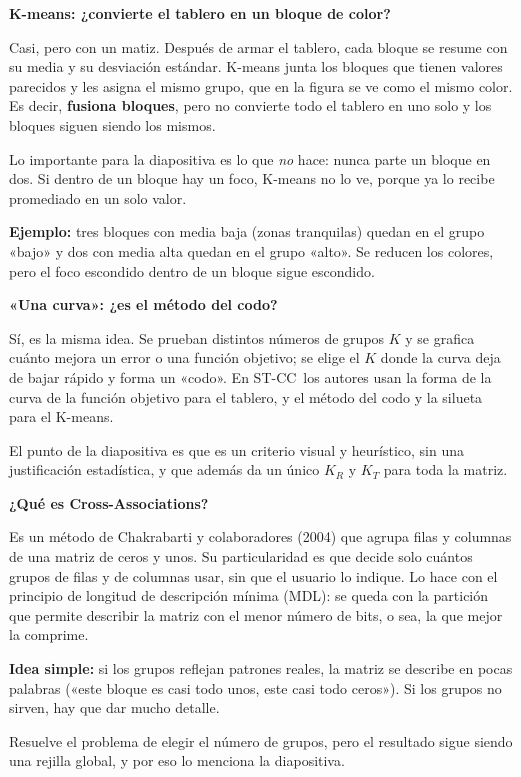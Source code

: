 \documentclass[11pt,a4paper]{article}
\newcommand{\cajainicio}[3]{\par\medskip\noindent
  \begin{lrbox}{\cajabox}\begin{minipage}{\dimexpr\linewidth-2\fboxsep-2\fboxrule\relax}%
  \textbf{\color{#1}#3}\par\smallskip}
\newcommand{\cajafin}[2]{\end{minipage}\end{lrbox}\fcolorbox{#1}{#2}{\usebox{\cajabox}}\par\medskip}
\newenvironment{nota}[1]{\cajainicio{acc}{acc!7}{#1}}{\cajafin{acc}{acc!7}}
\newcommand{\STCC}{ST-CC}
\begin{document}
\begin{nota}{K-means: ¿convierte el tablero en un bloque de color?}
Casi, pero con un matiz. Después de armar el tablero, cada bloque se resume con su media y su desviación estándar. K-means junta los bloques que tienen valores parecidos y les asigna el mismo grupo, que en la figura se ve como el mismo color. Es decir, \textbf{fusiona bloques}, pero no convierte todo el tablero en uno solo y los bloques siguen siendo los mismos.

Lo importante para la diapositiva es lo que \emph{no} hace: nunca parte un bloque en dos. Si dentro de un bloque hay un foco, K-means no lo ve, porque ya lo recibe promediado en un solo valor.

\textbf{Ejemplo:} tres bloques con media baja (zonas tranquilas) quedan en el grupo «bajo» y dos con media alta quedan en el grupo «alto». Se reducen los colores, pero el foco escondido dentro de un bloque sigue escondido.
\end{nota}

\begin{nota}{«Una curva»: ¿es el método del codo?}
Sí, es la misma idea. Se prueban distintos números de grupos $K$ y se grafica cuánto mejora un error o una función objetivo; se elige el $K$ donde la curva deja de bajar rápido y forma un «codo». En \STCC\ los autores usan la forma de la curva de la función objetivo para el tablero, y el método del codo y la silueta para el K-means.

El punto de la diapositiva es que es un criterio visual y heurístico, sin una justificación estadística, y que además da un único $K_R$ y $K_T$ para toda la matriz.
\end{nota}

\begin{nota}{¿Qué es Cross-Associations?}
Es un método de Chakrabarti y colaboradores (2004) que agrupa filas y columnas de una matriz de ceros y unos. Su particularidad es que decide solo cuántos grupos de filas y de columnas usar, sin que el usuario lo indique. Lo hace con el principio de longitud de descripción mínima (MDL): se queda con la partición que permite describir la matriz con el menor número de bits, o sea, la que mejor la comprime.

\textbf{Idea simple:} si los grupos reflejan patrones reales, la matriz se describe en pocas palabras («este bloque es casi todo unos, este casi todo ceros»). Si los grupos no sirven, hay que dar mucho detalle.

Resuelve el problema de elegir el número de grupos, pero el resultado sigue siendo una rejilla global, y por eso lo menciona la diapositiva.
\end{nota}
\end{document}
